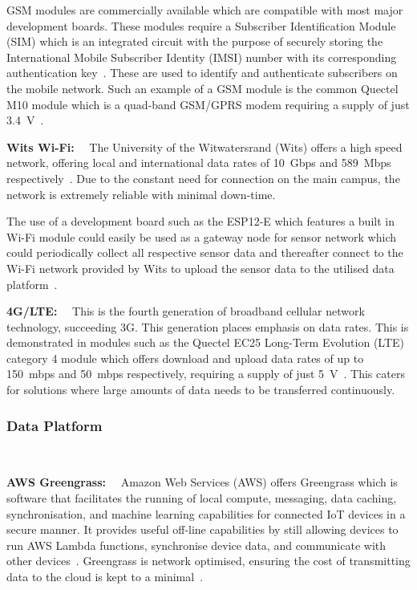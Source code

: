 \documentclass[10pt,twocolumn]{witseiepaper}
\begin{document}
				GSM modules are commercially available which are compatible with most major development boards. These modules require a Subscriber Identification Module (SIM) which is an integrated circuit with the purpose of securely storing the International Mobile Subscriber Identity (IMSI) number with its corresponding authentication key~\cite{imsi}. These are used to identify and authenticate subscribers on the mobile network. Such an example of a GSM module is the common Quectel M10 module which is a quad-band GSM/GPRS modem requiring a supply of just 3.4~V~\cite{m10}.

				\textbf{Wits Wi-Fi:}~~
				The University of the Witwatersrand (Wits) offers a high speed network, offering local and international data rates of 10~Gbps and 589~Mbps respectively~\cite{wits-speed}. Due to the constant need for connection on the main campus, the network is extremely reliable with minimal down-time.
				
				The use of a development board such as the ESP12-E which features a built in Wi-Fi module could easily be used as a gateway node for sensor network which could periodically collect all respective sensor data and thereafter connect to the Wi-Fi network provided by Wits to upload the sensor data to the utilised data platform~\cite{esp12e}.
			
				\textbf{4G/LTE:}~~
				This is the fourth generation of broadband cellular network technology, succeeding 3G. This generation places emphasis on data rates. This is demonstrated in modules such as the Quectel EC25 Long-Term Evolution (LTE) category 4 module which offers download and upload data rates of up to 150~mbps and 50~mbps respectively, requiring a supply of just 5~V~\cite{ec25}. This caters for solutions where large amounts of data needs to be transferred continuously.

		\subsubsection{Data Platform} $   $
		
				\textbf{AWS Greengrass:}~~
				Amazon Web Services (AWS) offers Greengrass which is software that facilitates the running of local compute, messaging, data caching, synchronisation, and machine learning capabilities for connected IoT devices in a secure manner. It provides useful off-line capabilities by still allowing devices to run AWS Lambda functions, synchronise device data, and communicate with other devices~\cite{greengrass}. Greengrass is network optimised, ensuring the cost of transmitting data to the cloud is kept to a minimal~\cite{greengrass}.
				
\end{document}

